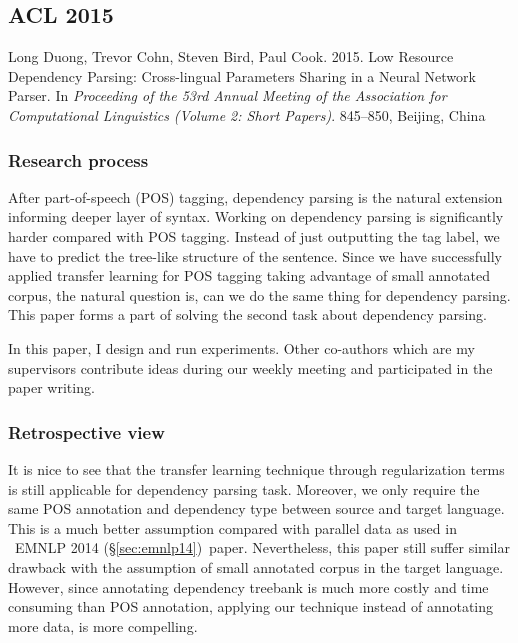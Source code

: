 \documentclass[12pt,twoside,final,hidelinks]{ltthesis}
\theoremstyle{definition}
\newcommand\emnlpiv{EMNLP 2014 (\S\ref{sec:emnlp14})}
\begin{document}
%


\subsection{ACL 2015}
\label{sec:acl15}
Long Duong, Trevor Cohn, Steven Bird, Paul Cook. 2015. Low Resource Dependency Parsing: Cross-lingual Parameters Sharing in a Neural Network Parser. In\textit{ Proceeding of the 53rd Annual Meeting of the Association for Computational Linguistics (Volume 2: Short Papers)}.  845--850, Beijing, China

\subsubsection{Research process}


After part-of-speech (POS) tagging, dependency parsing is the natural extension informing deeper layer of syntax. Working on dependency parsing is significantly 
harder compared with POS tagging. Instead of just outputting the tag label, we have to predict the tree-like structure of the sentence. Since we have successfully 
applied transfer learning for POS tagging taking advantage of small annotated corpus, the natural question is, can we do the same thing for dependency 
parsing. This paper forms a part of solving the second task about dependency parsing. 

In this paper, I design and run experiments. Other co-authors which are my supervisors contribute ideas during our weekly 
meeting and participated in the paper writing. 

\subsubsection{Retrospective view}
It is nice to see that the transfer learning technique through regularization terms is still applicable for dependency parsing task. Moreover, we only 
require the same POS annotation and dependency type between source and target language. This is a much better 
assumption compared with parallel data as used in ~\emnlpiv\ paper. Nevertheless, this paper still suffer similar drawback with the assumption of 
small annotated corpus in the target language. However, since annotating dependency treebank is much more costly and time consuming than POS annotation, 
applying our technique instead of annotating more data, is more compelling.  
\end{document}
